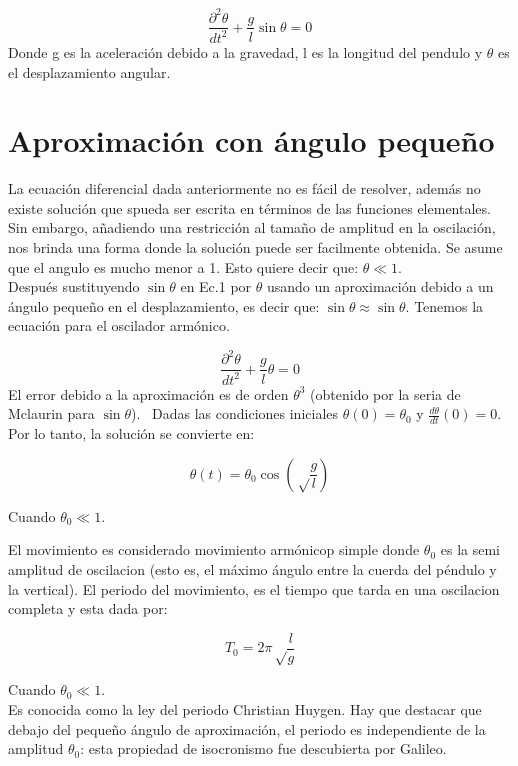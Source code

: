 \documentclass[12pt]{article}
\begin{document}
\begin{equation}
\frac{\partial^2 \theta}{dt^2}+\frac{g}{l}\sin\theta=0
\end{equation}
Donde g es la aceleración debido a la gravedad, l es la longitud del pendulo y $\theta$ es el desplazamiento angular.

\section{Aproximación con ángulo pequeño}
La ecuación diferencial dada anteriormente no es fácil de resolver, además no existe solución que spueda ser escrita en términos de las funciones elementales. Sin embargo, añadiendo una restricción al tamaño de amplitud en la oscilación, nos brinda una forma donde la solución puede ser facilmente obtenida. Se asume que el angulo es mucho menor a 1. Esto quiere decir que: $\theta \ll 1$. \\
Después sustituyendo $\sin \theta $ en Ec.1 por $\theta$  usando un aproximación debido a un ángulo pequeño en el desplazamiento, es decir que: $\sin \theta \approx \sin \theta$.
Tenemos la ecuación para el oscilador armónico. 

\begin{equation}
\frac{\partial^2 \theta}{dt^2}+\frac{g}{l}\theta=0
\end{equation}
El error debido a la aproximación es de orden $\theta^3$ (obtenido por la seria de Mclaurin para $\sin\theta$). \
Dadas las condiciones iniciales $\theta(0)= \theta_0$ y $\frac{d\theta}{dt}(0)=0$. Por lo tanto, la solución se convierte en:

\begin{equation}
\theta(t)=\theta_0 \cos \left (\sqrt \frac{g}{l} \right)
\end{equation}

Cuando $\theta_0 \ll 1$.

El movimiento es considerado movimiento armónicop simple donde $\theta_0$ es la semi amplitud de oscilacion (esto es, el máximo ángulo entre la cuerda del péndulo y la vertical). El periodo del movimiento, es el tiempo que tarda en una oscilacion completa y esta dada por: 

\begin{equation}
T_0=2\pi \sqrt \frac{l}{g}
\end{equation}

Cuando $\theta_0 \ll 1$. \\

Es conocida como la ley del periodo Christian Huygen. Hay que destacar que debajo del pequeño ángulo de aproximación, el periodo es independiente de la amplitud $\theta_0$: esta propiedad de isocronismo fue descubierta por Galileo.
 
\end{document}
